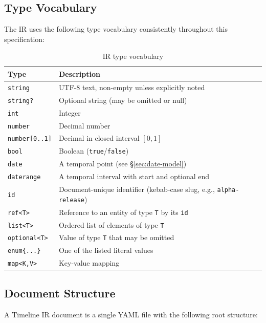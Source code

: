 \subsection{Type Vocabulary}
\label{sec:ir-types}

The IR uses the following type vocabulary consistently throughout this specification:

\begin{table}[h]
\centering
\begin{tabular}{lp{10cm}}
\toprule
\textbf{Type} & \textbf{Description} \\
\midrule
\texttt{string} & UTF-8 text, non-empty unless explicitly noted \\
\texttt{string?} & Optional string (may be omitted or null) \\
\texttt{int} & Integer \\
\texttt{number} & Decimal number \\
\texttt{number[0..1]} & Decimal in closed interval $[0, 1]$ \\
\texttt{bool} & Boolean (\texttt{true}/\texttt{false}) \\
\texttt{date} & A temporal point (see \S\ref{sec:date-model}) \\
\texttt{daterange} & A temporal interval with start and optional end \\
\texttt{id} & Document-unique identifier (kebab-case slug, e.g., \texttt{alpha-release}) \\
\texttt{ref<T>} & Reference to an entity of type \texttt{T} by its \texttt{id} \\
\texttt{list<T>} & Ordered list of elements of type \texttt{T} \\
\texttt{optional<T>} & Value of type \texttt{T} that may be omitted \\
\texttt{enum\{...\}} & One of the listed literal values \\
\texttt{map<K,V>} & Key-value mapping \\
\bottomrule
\end{tabular}
\caption{IR type vocabulary}
\label{tab:type-vocab}
\end{table}

\subsection{Document Structure}
\label{sec:ir-structure}

A Timeline IR document is a single YAML file with the following root structure:

